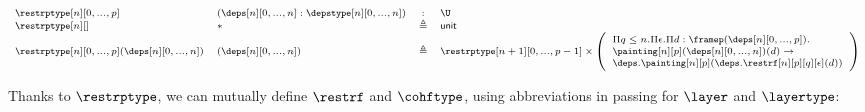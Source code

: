 \documentclass{msc}
\newcommand{\unittype}{\ensuremath{\mathsf{unit}}}
\newcommand{\unitpoint}{\ensuremath{\ast}}
\newcommand{\defeq}{\ensuremath{\triangleq}}
\begin{document}
\begin{equation*}
  \fontsize{7.2}{9}\selectfont
  \begin{array}{llcl}
    \restrptype[n][0,...,p]                    & (\deps[n][0,...,n]:\depstype[n][0,...,n]) & :      & \U                                        \\
    \restrptype[n][]                           & \unitpoint                                & \defeq & \unittype                                 \\
    \restrptype[n][0,...,p](\deps[n][0,...,n]) & (\deps[n][0,...,n])                       & \defeq & \restrptype[n+1][0,...,p-1] \times \left(
    \begin{array}{l}
        \Pi q\leq n.\Pi \epsilon.\Pi d:\framep(\deps[n][0,...,p]). \\
        \painting[n][p](\deps[n][0,...,n])(d) \rightarrow          \\ \deps.\painting[n][p](\deps.\restrf[n][p][q][\epsilon](d))\end{array}
    \right)                                                                                                                                     \\
  \end{array}
\end{equation*}

Thanks to $\restrptype$, we can mutually define $\restrf$ and $\cohftype$, using abbreviations in passing for $\layer$ and $\layertype$:
\end{document}
